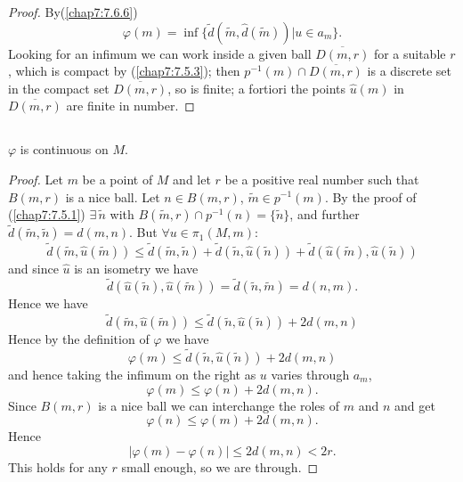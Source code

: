 \begin{proof}
By\pageoriginale (\ref{chap7:7.6.6})
$$
\varphi(m)=\inf\{\widetilde{d}(\widetilde{m},\widehat{d}(\widetilde{m}))|u\in
a_{m}\}. 
$$
Looking for an infimum we can work inside a given ball
$\overline{D(m,r)}$ for a suitable $r$, which is compact by
(\ref{chap7:7.5.3}); then $p^{-1}(m)\cap \overline{D(m,r)}$ is a discrete
set in the compact set $\overline{D(m,r)}$, so is finite; a fortiori
the points $\widehat{u}(m)$ in $\overline{D(m,r)}$ are finite in
number. 
\end{proof}

\subsection{}\label{chap7:7.6.9}

\begin{lemma*}
$\varphi$ is continuous on $M$. 
\end{lemma*}

\begin{proof}
Let $m$ be a point of $M$ and let $r$ be a positive real number such
that $B(m,r)$ is a nice ball. Let $n\in B(m,r)$, $\widetilde{m}\in
p^{-1}(m)$. By the proof of (\ref{chap7:7.5.1}) $\exists\,
\widetilde{n}$ with $B(\widetilde{m},r)\cap
p^{-1}(n)=\{\widetilde{n}\}$, and further
$\widetilde{d}(\widetilde{m},\widetilde{n})=d(m,n)$. But $\forall u\in
\pi_{1}(M,m)$: 
$$
\widetilde{d}(\widetilde{m},\widehat{u}(\widetilde{m}))\leq
\widetilde{d}(\widetilde{m},\widetilde{n})+\widetilde{d}(\widetilde{n},\widehat{u}(\widetilde{n}))+\widetilde{d}(\widehat{u}(\widetilde{m}),\widehat{u}(\widetilde{n})) 
$$
and since $\widehat{u}$ is an isometry we have
$$
\widetilde{d}(\widehat{u}(\widetilde{n}),\widehat{u}(\widetilde{m}))=\widetilde{d}(\widetilde{n},\widetilde{m})=d(n,m). 
$$
Hence we have
$$
\widetilde{d}(\widetilde{m},\widehat{u}(\widetilde{m}))\leq
\widetilde{d}(\widetilde{n},\widehat{u}(\widetilde{n}))+2d(m,n)
$$
Hence by the definition of $\varphi$ we have
$$
\varphi(m)\leq\widetilde{d}(\widetilde{n},\widehat{u}(\widetilde{n}))+2d(m,n)
$$
and hence taking the infimum on the right as $u$ varies through
$a_{m}$, 
$$
\varphi(m)\leq \varphi(n)+2d(m,n).
$$
Since $B(m,r)$ is a nice ball we can interchange the roles of $m$ and
$n$ and get
$$
\varphi(n)\leq \varphi(m)+2d(m,n).
$$
Hence
$$
|\varphi(m)-\varphi(n)|\leq 2d(m,n)<2r.
$$
This \pageoriginale holds for any $r$ small enough, so we are through.
\end{proof}

\subsection{}\label{chap7:7.6.10}

